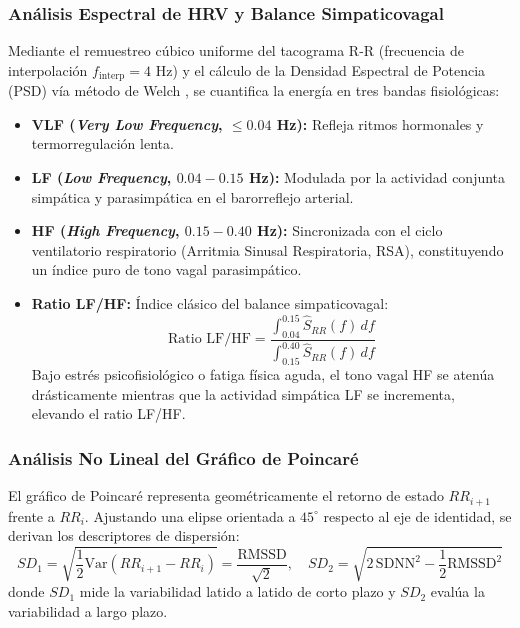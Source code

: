 \subsubsection{Análisis Espectral de HRV y Balance Simpaticovagal}
Mediante el remuestreo cúbico uniforme del tacograma R-R (frecuencia de interpolación $f_{\text{interp}} = 4$ Hz) y el cálculo de la Densidad Espectral de Potencia (PSD) vía método de Welch \cite{oppenheim1999discrete}, se cuantifica la energía en tres bandas fisiológicas:
\begin{itemize}
    \item \textbf{VLF (\textit{Very Low Frequency}, $\le 0.04$ Hz):} Refleja ritmos hormonales y termorregulación lenta.
    \item \textbf{LF (\textit{Low Frequency}, $0.04 - 0.15$ Hz):} Modulada por la actividad conjunta simpática y parasimpática en el barorreflejo arterial.
    \item \textbf{HF (\textit{High Frequency}, $0.15 - 0.40$ Hz):} Sincronizada con el ciclo ventilatorio respiratorio (Arritmia Sinusal Respiratoria, RSA), constituyendo un índice puro de tono vagal parasimpático.
    \item \textbf{Ratio LF/HF:} Índice clásico del balance simpaticovagal:
    \begin{equation}
        \text{Ratio LF/HF} = \frac{\int_{0.04}^{0.15} \hat{S}_{RR}(f)\,df}{\int_{0.15}^{0.40} \hat{S}_{RR}(f)\,df}
    \end{equation}
    Bajo estrés psicofisiológico o fatiga física aguda, el tono vagal HF se atenúa drásticamente mientras que la actividad simpática LF se incrementa, elevando el ratio LF/HF.
\end{itemize}

\subsubsection{Análisis No Lineal del Gráfico de Poincaré}
El gráfico de Poincaré representa geométricamente el retorno de estado $RR_{i+1}$ frente a $RR_i$. Ajustando una elipse orientada a $45^\circ$ respecto al eje de identidad, se derivan los descriptores de dispersión:
\begin{equation}
    SD_1 = \sqrt{\frac{1}{2}\text{Var}(RR_{i+1} - RR_i)} = \frac{\text{RMSSD}}{\sqrt{2}}, \quad SD_2 = \sqrt{2\,\text{SDNN}^2 - \frac{1}{2}\text{RMSSD}^2}
\end{equation}
donde $SD_1$ mide la variabilidad latido a latido de corto plazo y $SD_2$ evalúa la variabilidad a largo plazo.

